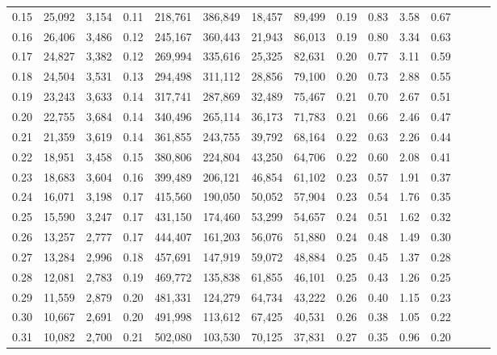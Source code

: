 \begin{tabular}{rrrrrrrrrrrrrrr}
0.15 &  25,092 &  3,154 &  0.11 &  218,761 &  386,849 &   18,457 &   89,499 &  0.19 &  0.83 &  3.58 &      0.67 \\
0.16 &  26,406 &  3,486 &  0.12 &  245,167 &  360,443 &   21,943 &   86,013 &  0.19 &  0.80 &  3.34 &      0.63 \\
0.17 &  24,827 &  3,382 &  0.12 &  269,994 &  335,616 &   25,325 &   82,631 &  0.20 &  0.77 &  3.11 &      0.59 \\
0.18 &  24,504 &  3,531 &  0.13 &  294,498 &  311,112 &   28,856 &   79,100 &  0.20 &  0.73 &  2.88 &      0.55 \\
0.19 &  23,243 &  3,633 &  0.14 &  317,741 &  287,869 &   32,489 &   75,467 &  0.21 &  0.70 &  2.67 &      0.51 \\
0.20 &  22,755 &  3,684 &  0.14 &  340,496 &  265,114 &   36,173 &   71,783 &  0.21 &  0.66 &  2.46 &      0.47 \\
0.21 &  21,359 &  3,619 &  0.14 &  361,855 &  243,755 &   39,792 &   68,164 &  0.22 &  0.63 &  2.26 &      0.44 \\
0.22 &  18,951 &  3,458 &  0.15 &  380,806 &  224,804 &   43,250 &   64,706 &  0.22 &  0.60 &  2.08 &      0.41 \\
0.23 &  18,683 &  3,604 &  0.16 &  399,489 &  206,121 &   46,854 &   61,102 &  0.23 &  0.57 &  1.91 &      0.37 \\
0.24 &  16,071 &  3,198 &  0.17 &  415,560 &  190,050 &   50,052 &   57,904 &  0.23 &  0.54 &  1.76 &      0.35 \\
0.25 &  15,590 &  3,247 &  0.17 &  431,150 &  174,460 &   53,299 &   54,657 &  0.24 &  0.51 &  1.62 &      0.32 \\
0.26 &  13,257 &  2,777 &  0.17 &  444,407 &  161,203 &   56,076 &   51,880 &  0.24 &  0.48 &  1.49 &      0.30 \\
0.27 &  13,284 &  2,996 &  0.18 &  457,691 &  147,919 &   59,072 &   48,884 &  0.25 &  0.45 &  1.37 &      0.28 \\
0.28 &  12,081 &  2,783 &  0.19 &  469,772 &  135,838 &   61,855 &   46,101 &  0.25 &  0.43 &  1.26 &      0.25 \\
0.29 &  11,559 &  2,879 &  0.20 &  481,331 &  124,279 &   64,734 &   43,222 &  0.26 &  0.40 &  1.15 &      0.23 \\
0.30 &  10,667 &  2,691 &  0.20 &  491,998 &  113,612 &   67,425 &   40,531 &  0.26 &  0.38 &  1.05 &      0.22 \\
0.31 &  10,082 &  2,700 &  0.21 &  502,080 &  103,530 &   70,125 &   37,831 &  0.27 &  0.35 &  0.96 &      0.20 \\

\end{tabular}
